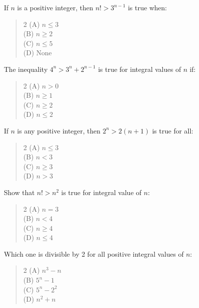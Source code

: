 \documentclass[11pt,a4paper]{article}
\begin{document}
\begin{mcqlist}
\item If $n$ is a positive integer, then $n!>3^{n-1}$ is true when:
\begin{quote}\begin{multicols}{2}
\noindent (A) $n\leq3$ \\
(B) $n\geq2$ \\
(C) $n\leq5$ \\
(D) None
\end{multicols}\end{quote}

\item The inequality $4^n>3^n+2^{n-1}$ is true for integral values of $n$ if:
\begin{quote}\begin{multicols}{2}
\noindent (A) $n>0$ \\
(B) $n\geq1$ \\
(C) $n\geq2$ \\
(D) $n\leq2$
\end{multicols}\end{quote}

\item If $n$ is any positive integer, then $2^n>2(n+1)$ is true for all:
\begin{quote}\begin{multicols}{2}
\noindent (A) $n\leq3$ \\
(B) $n<3$ \\
(C) $n\geq3$ \\
(D) $n>3$
\end{multicols}\end{quote}

\item Show that $n!>n^2$ is true for integral value of $n$:
\begin{quote}\begin{multicols}{2}
\noindent (A) $n=3$ \\
(B) $n<4$ \\
(C) $n\geq4$ \\
(D) $n\leq4$
\end{multicols}\end{quote}

\item Which one is divisible by 2 for all positive integral values of $n$:
\begin{quote}\begin{multicols}{2}
\noindent (A) $n^3-n$ \\
(B) $5^n-1$ \\
(C) $5^n-2^2$ \\
(D) $n^2+n$
\end{multicols}\end{quote}


\end{mcqlist}
\end{document}
